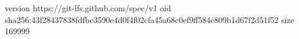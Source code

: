 version https://git-lfs.github.com/spec/v1
oid sha256:43f28437838fdfbe3590e4d0f4f02cfa45a68c0ef9ff584c809b1d67f2d51f52
size 169999
